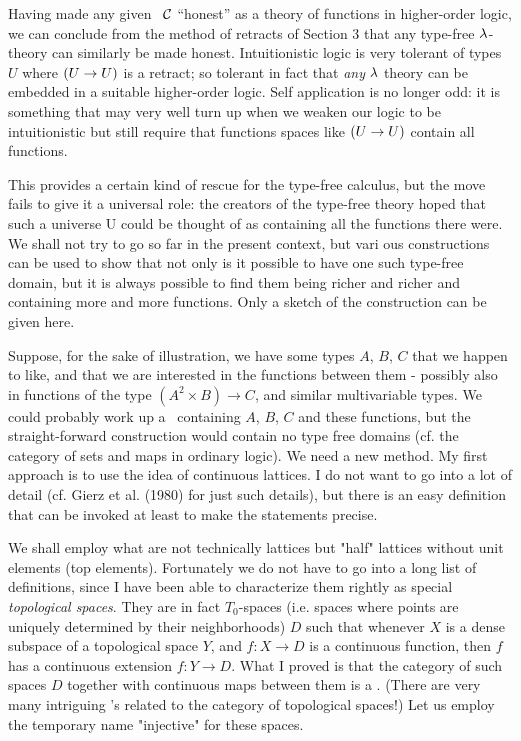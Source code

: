 Having made any given \ccc\ $\mathcal C$ ``honest'' as a theory of func­tions in higher-order logic, we can conclude from the method of retracts of Section 3 that any type-free $\lambda$-theory can similarly be made honest. Intuitionistic logic is very tolerant of types $U$ where $(U\rightarrow U)$ is a retract; so tolerant in fact that {\it any} $\lambda$ theory can be embedded in a suitable higher-order logic. Self­ application is no longer odd: it is something that may very well turn up when we weaken our logic to be intuitionistic but still require that functions spaces like $(U\rightarrow U)$ contain all functions.

This provides a certain kind of rescue for the type-free calculus, but the move fails to give it a universal role: the creators of the type-free theory hoped that such a universe U could be thought of as containing all the functions there were. We shall not try to go so far in the present context, but vari­ ous constructions can be used to show that not only is it pos­sible to have one such type-free domain, but it is always pos­sible to find them being richer and richer and containing more and more functions. Only a sketch of the construction can be given here.

Suppose, for the sake of illustration, we have some types $A$, $B$, $C$ that we happen to like, and that we are interested in the
functions between them - possibly also in functions of the type $(A^2 \times B) \to C$, and similar multivariable types. We could probably work up a \ccc\  containing $A$, $B$, $C$ and these functions, but the straight-forward construction would contain no type­ free domains (cf. the category of sets and maps in ordinary logic). We need a new method. My first approach is to use the idea of continuous lattices. I do not want to go into a lot of detail (cf. Gierz et al. (1980) for just such details), but there is an easy definition that can be invoked at least to make the statements precise.

We shall employ what are not technically lattices but "half" lattices without unit elements (top elements). Fortunately we do not have to go into a long list of definitions, since I have been able to characterize them rightly as special {\it topological spaces}. They are in fact $T_0$-spaces (i.e. spaces where points are uniquely determined by their neighborhoods) $D$ such that whenever $X$ is a dense subspace of a topological space $Y$, and $f : X\to D$ is a continuous function, then $f$ has a continuous ex­tension $f:Y\to D$. What I proved is that the category of such spaces $D$ together with continuous maps between them is a \ccc . (There are very many intriguing \ccc's related to the cate­gory of topological spaces!) Let us employ the temporary name "injective" for these spaces.

